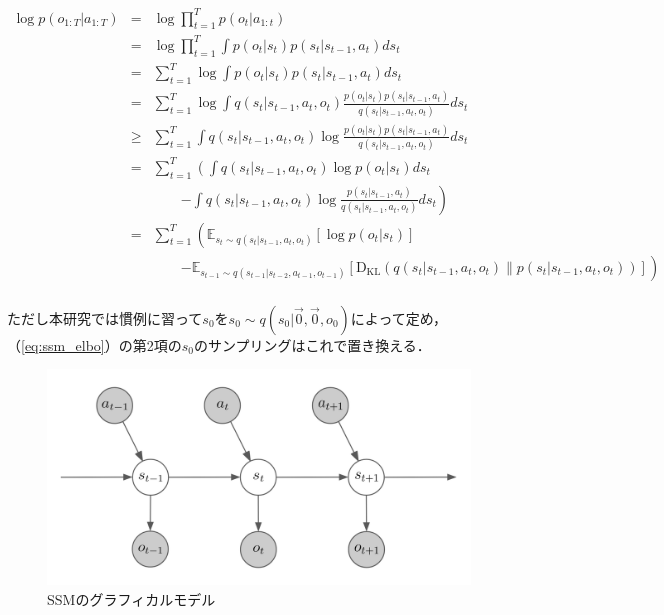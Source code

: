 \begin{eqnarray}
  \log p(o_{1:T}|a_{1:T})
  &=& \log \prod_{t=1}^T p(o_t|a_{1:t}) \nonumber \\
  &=& \log \prod_{t=1}^T \int p(o_t|s_t) p(s_t|s_{t-1}, a_t)ds_t \nonumber \\
  &=& \sum_{t=1}^T \log \int p(o_t|s_t) p(s_t|s_{t-1}, a_t)ds_t \nonumber \\
  &=& \sum_{t=1}^T \log \int q(s_t|s_{t-1}, a_t, o_t) \frac{p(o_t|s_t) p(s_t|s_{t-1}, a_t)}{q(s_t|s_{t-1}, a_t, o_t)}ds_t \nonumber \\
  &\geq& \sum_{t=1}^T \int q(s_t|s_{t-1}, a_t, o_t) \log \frac{p(o_t|s_t) p(s_t|s_{t-1}, a_t)}{q(s_t|s_{t-1}, a_t, o_t)}ds_t \nonumber \\
  &=& \sum_{t=1}^T \left( \int q(s_t|s_{t-1}, a_t, o_t) \log p(o_t|s_t)ds_t \right. \nonumber \\
  && \hspace{2em} \left. - \int q(s_t|s_{t-1}, a_t, o_t) \log \frac{p(s_t|s_{t-1}, a_t)}{q(s_t|s_{t-1}, a_t, o_t)}ds_t \right) \nonumber \\
  &=& \sum_{t=1}^T \left( \mathbb{E}_{s_t \sim q(s_t|s_{t-1}, a_t, o_t)} [\log p(o_t|s_t)] \right. \nonumber \\
  && \hspace{2em} \left. - \mathbb{E}_{s_{t-1} \sim q(s_{t-1}|s_{t-2}, a_{t-1}, o_{t-1})} [\mathrm{D_{KL}}(q(s_t|s_{t-1}, a_t, o_t) \| p(s_t|s_{t-1}, a_t, o_t))] \right)  \nonumber \\
  \label{eq:ssm_elbo}
\end{eqnarray}

ただし本研究では慣例に習って$s_0$を$s_0 \sim q(s_0|\vec{0}, \vec{0}, o_0) $によって定め，（\ref{eq:ssm_elbo}）の第2項の$s_0$のサンプリングはこれで置き換える．




\begin{figure}[tbp]
  \begin{center}
    \includegraphics[width=\linewidth]{./figures/ssm.png}
    \caption{SSMのグラフィカルモデル}
    \label{fig:ssm}
  \end{center}
\end{figure}
